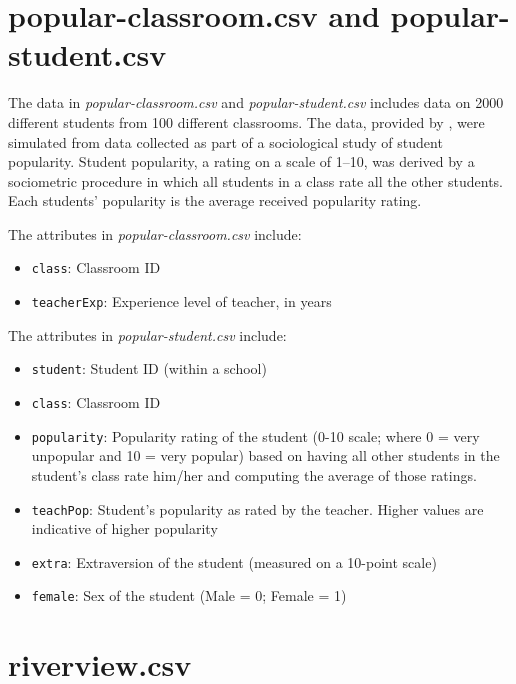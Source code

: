 \documentclass[]{book}
\providecommand{\tightlist}{%
  \setlength{\itemsep}{0pt}\setlength{\parskip}{0pt}}
\begin{document}
\hypertarget{popular}{%
\section*{popular-classroom.csv and popular-student.csv}\label{popular}}

The data in \emph{popular-classroom.csv} and \emph{popular-student.csv} includes data on 2000 different students from 100 different classrooms. The data, provided by \citet{Hox:2002}, were simulated from data collected as part of a sociological study of student popularity. Student popularity, a rating on a scale of 1--10, was derived by a sociometric procedure in which all students in a class rate all the other students. Each students' popularity is the average received popularity rating.

The attributes in \emph{popular-classroom.csv} include:

\begin{itemize}
\tightlist
\item
  \texttt{class}: Classroom ID
\item
  \texttt{teacherExp}: Experience level of teacher, in years
\end{itemize}

The attributes in \emph{popular-student.csv} include:

\begin{itemize}
\tightlist
\item
  \texttt{student}: Student ID (within a school)
\item
  \texttt{class}: Classroom ID
\item
  \texttt{popularity}: Popularity rating of the student (0-10 scale; where 0 = very unpopular and 10 = very popular) based on having all other students in the student's class rate him/her and computing the average of those ratings.
\item
  \texttt{teachPop}: Student's popularity as rated by the teacher. Higher values are indicative of higher popularity
\item
  \texttt{extra}: Extraversion of the student (measured on a 10-point scale)
\item
  \texttt{female}: Sex of the student (Male = 0; Female = 1)
\end{itemize}

\hypertarget{riverview}{%
\section*{riverview.csv}\label{riverview}}
\end{document}
